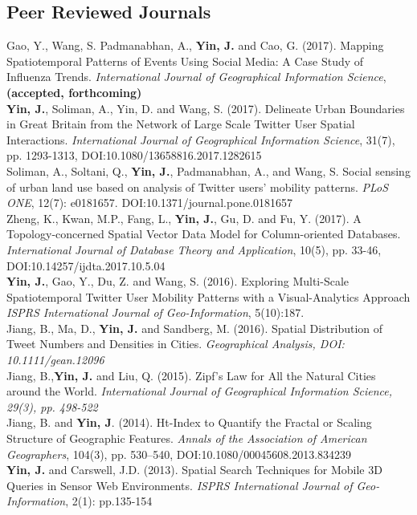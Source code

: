 \documentclass[11pt, a4paper]{article}
\newcommand{\years}[1]{\marginnote{\scriptsize #1}}
\begin{document}
\subsection*{Peer Reviewed Journals}
\noindent
\years{2017}Gao, Y., Wang, S. Padmanabhan, A., \textbf{Yin, J.} and Cao, G. (2017). Mapping Spatiotemporal Patterns of Events Using Social Media: A Case Study of Influenza Trends. \textit{International Journal of Geographical Information Science}, \textbf{(accepted, forthcoming)}\\
\years{2017}\textbf{Yin, J.}, Soliman, A., Yin, D. and Wang, S. (2017). Delineate Urban Boundaries in Great Britain from the Network of Large Scale Twitter User Spatial Interactions. \textit{International Journal of Geographical Information Science}, 31(7), pp. 1293-1313, DOI:10.1080/13658816.2017.1282615\\
\years{2017} Soliman, A., Soltani, Q., \textbf{Yin, J.}, Padmanabhan, A., and Wang, S. Social sensing of urban land use based on analysis of Twitter users' mobility patterns. \textit{PLoS ONE}, 12(7): e0181657. DOI:10.1371/journal.pone.0181657\\
\years{2017}Zheng, K., Kwan, M.P., Fang, L., \textbf{Yin, J.}, Gu, D. and Fu, Y. (2017). A Topology-concerned Spatial Vector Data Model for Column-oriented Databases. \textit{International Journal of Database Theory and Application}, 10(5), pp. 33-46, DOI:10.14257/ijdta.2017.10.5.04\\
\years{2016}\textbf{Yin, J.}, Gao, Y., Du, Z. and Wang, S. (2016). Exploring Multi-Scale Spatiotemporal Twitter User Mobility Patterns with a Visual-Analytics Approach \textit{ISPRS International Journal of Geo-Information}, 5(10):187.\\
\years{2016}Jiang, B., Ma, D., \textbf{Yin, J.} and Sandberg, M. (2016). Spatial Distribution of Tweet Numbers and Densities in Cities. \textit{ Geographical Analysis, DOI: 10.1111/gean.12096}\\
\years{2015}Jiang, B.,\textbf{Yin, J.} and Liu, Q. (2015). Zipf's Law for All the Natural Cities around the World. \textit{International Journal of Geographical Information Science, 29(3), pp. 498-522}\\
\years{2014}Jiang, B. and \textbf{Yin, J}. (2014). Ht-Index to Quantify the Fractal or Scaling Structure of Geographic Features. \textit{Annals of the Association of American Geographers}, 104(3), pp. 530–540, DOI:10.1080/00045608.2013.834239\\
\years{2013}\textbf{Yin, J.} and Carswell, J.D. (2013). Spatial Search Techniques for Mobile 3D Queries in Sensor Web Environments. \textit{ISPRS International Journal of Geo-Information}, 2(1): pp.135-154\\
\end{document}
